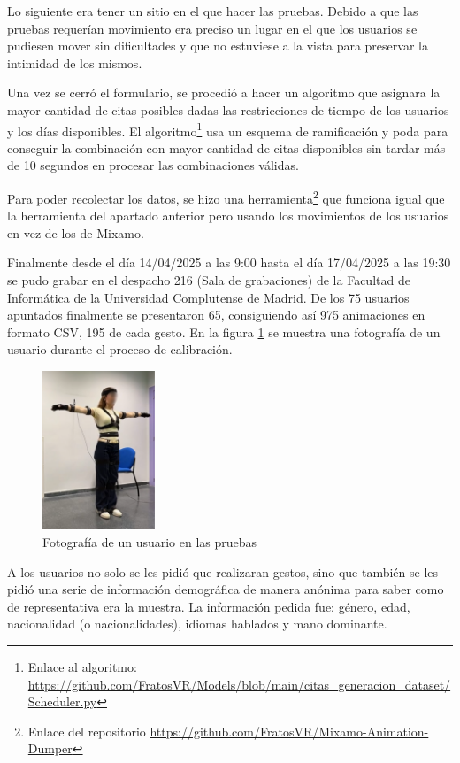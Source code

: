 Lo siguiente era tener un sitio en el que hacer las pruebas. Debido a que las pruebas requerían movimiento era preciso un lugar en el que los usuarios se pudiesen mover sin dificultades y que no estuviese a la vista para preservar la intimidad de los mismos.

Una vez se cerró el formulario, se procedió a hacer un algoritmo que asignara la mayor cantidad de citas posibles dadas las restricciones de tiempo de los usuarios y los días disponibles. El algoritmo\footnote{Enlace al algoritmo: \url{https://github.com/FratosVR/Models/blob/main/citas_generacion_dataset/Scheduler.py}} usa un esquema de ramificación y poda para conseguir la combinación con mayor cantidad de citas disponibles sin tardar más de 10 segundos en procesar las combinaciones válidas.

Para poder recolectar los datos, se hizo una herramienta\footnote{Enlace del repositorio \url{https://github.com/FratosVR/Mixamo-Animation-Dumper}} que funciona igual que la herramienta del apartado anterior pero usando los movimientos de los usuarios en vez de los de Mixamo.

Finalmente desde el día 14/04/2025 a las 9:00 hasta el día 17/04/2025 a las 19:30 se pudo grabar en el despacho 216 (Sala de grabaciones) de la Facultad de Informática de la Universidad Complutense de Madrid.
De los 75 usuarios apuntados finalmente se presentaron 65, consiguiendo así 975 animaciones en formato CSV, 195 de cada gesto. En la figura \ref{fig:PruebasLidia} se muestra una fotografía de un usuario durante el proceso de calibración.

\begin{figure}[H]
	\centering
	\includegraphics[width=0.3\textwidth]{Imagenes/Vectorial/LidiaPruebasBlurr.pdf}
	\caption{Fotografía de un usuario en las pruebas}
	\label{fig:PruebasLidia}
\end{figure}

A los usuarios no solo se les pidió que realizaran gestos, sino que también se les pidió una serie de información demográfica de manera anónima para saber como de representativa era la muestra. La información pedida fue: género, edad, nacionalidad (o nacionalidades), idiomas hablados y mano dominante.

